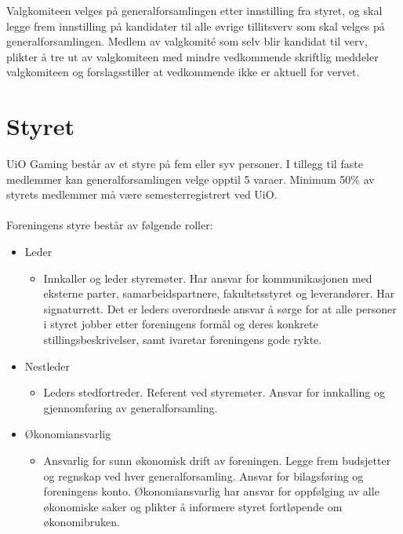 \documentclass[12pt,a4paper,norsk]{article}
\begin{document}
Valgkomiteen velges på generalforsamlingen etter innstilling fra styret, og skal
legge frem innstilling på kandidater til alle øvrige tillitsverv som skal velges på
generalforsamlingen. Medlem av valgkomité som selv blir kandidat til verv,
plikter å tre ut av valgkomiteen med mindre vedkommende skriftlig meddeler
valgkomiteen og forslagsstiller at vedkommende ikke er aktuell for vervet.



\section{Styret}

UiO Gaming består av et styre på fem eller syv personer. I tillegg til faste
medlemmer kan generalforsamlingen velge opptil 5 varaer. Minimum 50\% av styrets
medlemmer må være semesterregistrert ved UiO.
\\
\\
Foreningens styre består av følgende roller:
\begin{itemize}
    \item Leder
    \begin{itemize}
        \item Innkaller og leder styremøter. Har ansvar for kommunikasjonen med eksterne parter,
        samarbeidspartnere, fakultetsstyret og leverandører. Har signaturrett. Det er leders
        overordnede ansvar å sørge for at alle personer i styret jobber etter foreningens formål og deres
        konkrete stillingsbeskrivelser, samt ivaretar foreningens gode rykte.
    \end{itemize}

    \item Nestleder
    \begin{itemize}
        \item Leders stedfortreder. Referent ved styremøter. Ansvar for innkalling og gjennomføring
        av generalforsamling.
    \end{itemize}

    \item Økonomiansvarlig
    \begin{itemize}
        \item Ansvarlig for sunn økonomisk drift av foreningen. Legge frem budsjetter og regnskap ved
        hver generalforsamling. Ansvar for bilagsføring og foreningens konto. Økonomiansvarlig har
        ansvar for oppfølging av alle økonomiske saker og plikter å informere styret fortløpende om
        økonomibruken.
    \end{itemize}
\end{itemize}
\leavevmode
\end{document}
